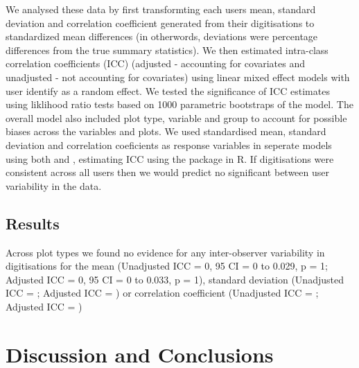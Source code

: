 \documentclass[article]{jss}
\begin{document}
We analysed these data by first transformting each users mean, standard deviation and correlation coefficient generated from their digitisations to standardized mean differences (in otherwords, deviations were percentage differences from the true summary statistics). We then estimated intra-class correlation coefficients (ICC) (adjusted - accounting for covariates and unadjusted - not accounting for covariates) using linear mixed effect models with user identify as a random effect. We tested the significance of ICC estimates using liklihood ratio tests based on 1000 parametric bootstraps of the model. The overall model also included plot type, variable and group to account for possible biases across the variables and plots. We used standardised mean, standard deviation and correlation coeficients as response variables in seperate models using both  \citep{bates2015} and  \citep{hadfield2010}, estimating ICC using the  package \citep{stoffel2017} in R. If digitisations were consistent across all users then we would predict no significant between user variability in the data. 

\subsection{Results}

  Across plot types we found no evidence for any inter-observer variability in digitisations for the mean (Unadjusted ICC = 0, 95 CI = 0 to 0.029, p = 1; Adjusted ICC = 0, 95 CI = 0 to 0.033, p = 1), standard deviation (Unadjusted ICC = ; Adjusted ICC = ) or correlation coefficient (Unadjusted ICC = ; Adjusted ICC = )

\section{Discussion and Conclusions}

\end{document}
